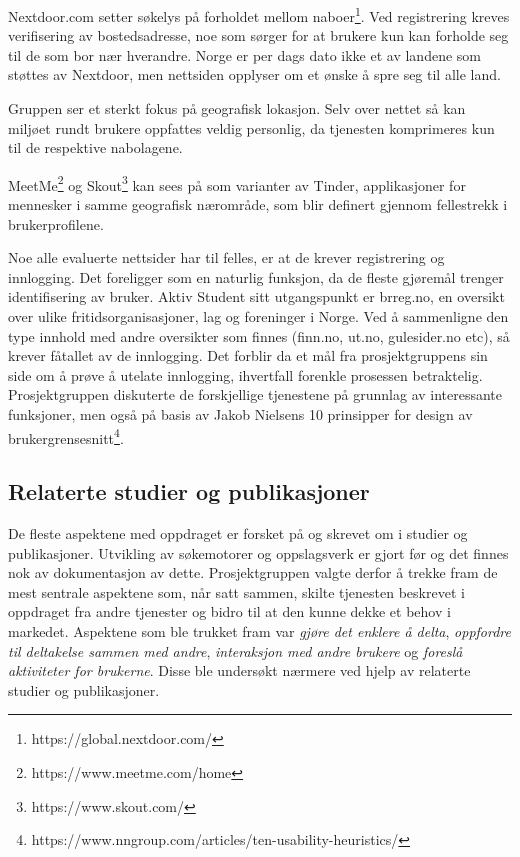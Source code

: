 \vspace{5mm} %

Nextdoor.com setter søkelys på forholdet mellom naboer\footnote{https://global.nextdoor.com/}. Ved registrering kreves verifisering av bostedsadresse, noe som sørger for at brukere kun kan forholde seg til de som bor nær hverandre. Norge er per dags dato ikke et av landene som støttes av Nextdoor, men nettsiden opplyser om et ønske å spre seg til alle land.

\vspace{5mm} %

Gruppen ser et sterkt fokus på geografisk lokasjon. Selv over nettet så kan miljøet rundt brukere oppfattes veldig personlig, da tjenesten komprimeres kun til de respektive nabolagene.

\vspace{5mm} %

MeetMe\footnote{https://www.meetme.com/home} og Skout\footnote{https://www.skout.com/} kan sees på som varianter av Tinder, applikasjoner for mennesker i samme geografisk nærområde, som blir definert gjennom fellestrekk i brukerprofilene.

\vspace{5mm} %

Noe alle evaluerte nettsider har til felles, er at de krever registrering og innlogging. Det foreligger som en naturlig funksjon, da de fleste gjøremål trenger identifisering av bruker. Aktiv Student sitt utgangspunkt er brreg.no, en oversikt over ulike fritidsorganisasjoner, lag og foreninger i Norge. Ved å sammenligne den type innhold med andre oversikter som finnes (finn.no, ut.no, gulesider.no etc), så krever fåtallet av de innlogging. Det forblir da et mål fra prosjektgruppens sin side om å prøve å utelate innlogging, ihvertfall forenkle prosessen betraktelig. Prosjektgruppen diskuterte de forskjellige tjenestene på grunnlag av interessante funksjoner, men også på basis av Jakob Nielsens 10 prinsipper for design av brukergrensesnitt\footnote{https://www.nngroup.com/articles/ten-usability-heuristics/}.

\subsection{Relaterte studier og publikasjoner}
De fleste aspektene med oppdraget er forsket på og skrevet om i studier og publikasjoner. Utvikling av søkemotorer og oppslagsverk er gjort før og det finnes nok av dokumentasjon av dette. Prosjektgruppen valgte derfor å trekke fram de mest sentrale aspektene som, når satt sammen, skilte tjenesten beskrevet i oppdraget fra andre tjenester og bidro til at den kunne dekke et behov i markedet. Aspektene som ble trukket fram var {\em gjøre det enklere å delta}, {\em oppfordre til deltakelse sammen med andre}, {\em interaksjon med andre brukere} og {\em foreslå aktiviteter for brukerne}. Disse ble undersøkt nærmere ved hjelp av relaterte studier og publikasjoner.

